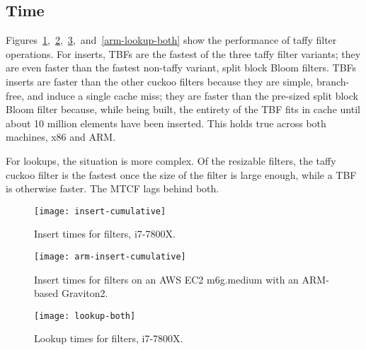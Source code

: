 \documentclass[letterpaper,twocolumn,10pt]{article}
\begin{document}


\subsection{Time}

Figures~\ref{insert-time},~\ref{arm-insert-time},~\ref{lookup-both},~and~\ref{arm-lookup-both} show the performance of taffy filter operations.
For inserts, TBFs are the fastest of the three taffy filter variants; they are even faster than the fastest non-taffy variant, split block Bloom filters.
TBFs inserts are faster than the other cuckoo filters because they are simple, branch-free, and induce a single cache miss; they are faster than the pre-sized split block Bloom filter because, while being built, the entirety of the TBF fits in cache until about 10 million elements have been inserted.
This holds true across both machines, x86 and ARM.

For lookups, the situation is more complex.
Of the resizable filters, the taffy cuckoo filter is the fastest once the size of the filter is large enough, while a TBF is otherwise faster.
The MTCF lags behind both.

\begin{figure}
  \texttt{[image: insert-cumulative]}
  \caption{
    \label{insert-time}
    Insert times for filters, i7-7800X.
  }
\end{figure}

\begin{figure}
  \texttt{[image: arm-insert-cumulative]}
  \caption{
    \label{arm-insert-time}
    Insert times for filters on an AWS EC2 m6g.medium with an ARM-based Graviton2.
  }
\end{figure}

\begin{figure}
  \texttt{[image: lookup-both]}
  \caption{
    \label{lookup-both}
    Lookup times for filters, i7-7800X.
  }
\end{figure}
\end{document}
